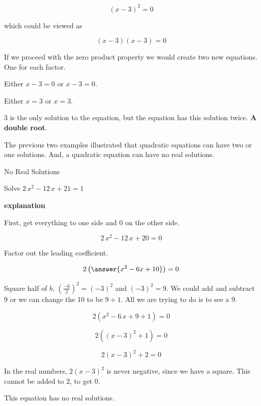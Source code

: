 \documentclass{ximera}
\begin{document}
\[  (x - 3)^2 = 0  \]

which could be viewed as 

\[  (x - 3) (x - 3) = 0  \]


If we proceed with the zero product property we would create two new equations.  One for each factor.

Either $x - 3 = 0$   or $x - 3 = 0$. 

Either $x = 3$ or $x = 3$.  

$3$ is the only solution to the equation, but the equation has this solution twice. \textbf{\textcolor{red!70!black}{A double root}}.


The previous two examples illustrated that quadratic equations can have two or one solutions.  And, a quadratic equation can have no real solutions.










\begin{example} No Real Solutions

Solve $2 \, x^2 - 12 \, x + 21 = 1$ 


\textbf{\textcolor{red!75!green}{explanation}} 


First, get everything to one side and $0$ on the other side.



\[  2 \, x^2 - 12 \, x + 20 = 0  \]

Factor out the leading coefficient.

\[  2 \left( \answer{x^2 - 6x + 10} \right) = 0  \]


Square half of $b$, $\left(\frac{-6}{2}\right)^2 = (-3)^2$ and $(-3)^2 = 9$.  We could add and subtract $9$ or we can change the $10$ to be $9+1$.  All we are trying to do is to see a $9$.



\[  2 (x^2 - 6 \, x + 9 + 1) = 0  \]


\[  2 ((x-3)^2 + 1) = 0  \]


\[  2 (x-3)^2 + 2 = 0  \]

In the real numbers, $2 (x-3)^2$ is never negative, since we have a square.  This cannot be added to $2$, to get $0$.  


This equation has no real solutions.



\end{example}
\end{document}
